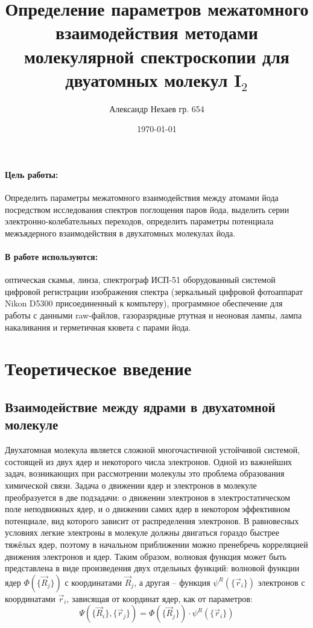 \documentclass[a4paper, 12pt]{article}
\title{Определение параметров межатомного взаимодействия методами молекулярной спектроскопии для двуатомных молекул I$_2$}
\author{Александр Нехаев гр. 654}
\date{\today}
\begin{document}
\maketitle
\paragraph{Цель работы:} Определить параметры межатомного взаимодействия между атомами йода посредством исследования спектров поглощения паров йода, выделить серии электронно-колебательных переходов, определить параметры потенциала межъядерного взаимодействия в двухатомных молекулах йода.
\paragraph{В работе используются:} оптическая скамья, линза, спектрограф ИСП-51 оборудованный системой цифровой регистрации изображения спектра (зеркальный цифровой фотоаппарат Nikon D5300 присоединенный к компьтеру), программное обеспечение для работы с данными raw-файлов, газоразрядные ртутная и неоновая лампы, лампа накаливания и герметичная кювета с парами йода.
\section{Теоретическое введение}
\subsection{Взаимодействие между ядрами в двухатомной молекуле}
Двухатомная молекула является сложной многочастичной устойчивой системой, состоящей из двух ядер и некоторого числа электронов. Одной из важнейших задач, возникающих при рассмотрении молекулы это проблема образования химической связи. Задача о движении ядер и электронов в молекуле преобразуется в две подзадачи: о движении электронов в электростатическом поле неподвижных ядер, и о движении самих ядер в некотором эффективном потенциале, вид которого зависит от распределения электронов. В равновесных условиях легкие электроны в молекуле должны двигаться гораздо быстрее тяжёлых ядер, поэтому в начальном приближении можно пренебречь корреляцией движения электронов и ядер. Таким образом, волновая функция может быть представлена в виде произведения двух отдельных функций: волновой функции ядер $\Phi\left(\{\vec{R}_j\}\right)$ с координатами $\vec{R}_j$, а другая -- функция $\psi^R\left(\{\vec{r}_i\}\right)$ электронов с координатами $\vec{r}_i$, зависящая от координат ядер, как от параметров:
\begin{equation}
	\Psi\left(\{\vec{R}_i\},\{\vec{r}_j\}\right)=\Phi\left(\{\vec{R}_j\}\right)\cdot \psi^R\left(\{\vec{r}_i\}\right)
	\label{eq:1}
\end{equation}
\end{document}
